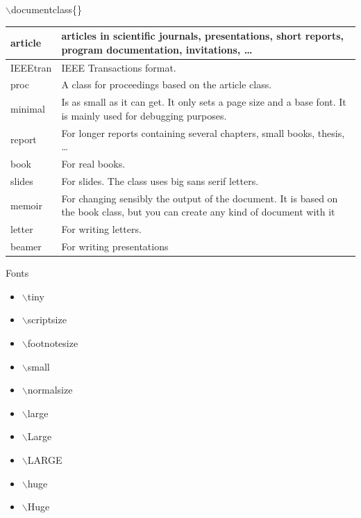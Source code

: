 \documentclass[10pt,times]{beamer}
\begin{document}
\begin{frame}{$\backslash$documentclass\{\}}

\begin{table}
\begin{tabular}{|l|p{}|}
\hline
article & articles in scientific journals, presentations, short reports, program documentation, invitations, \dots \\ \hline
IEEEtran & IEEE Transactions format.\\ \hline
proc & A class for proceedings based on the article class.\\ \hline
minimal & Is as small as it can get. It only sets a page size and a base font. It is mainly used for debugging purposes.\\ \hline
report & For longer reports containing several chapters, small books, thesis, \dots \\ \hline
book & For real books.\\ \hline
slides & For slides. The class uses big sans serif letters.\\ \hline
memoir & For changing sensibly the output of the document. It is based on the book class, but you can create any kind of document with it\\ \hline
letter & For writing letters. \\ \hline
beamer& For writing presentations \\ \hline
\end{tabular}
\end{table}
\end{frame}


\begin{frame}{Fonts}
\begin{itemize}
\item \tiny $\backslash$tiny
\item \scriptsize $\backslash$scriptsize
\item \footnotesize $\backslash$footnotesize
\item \small $\backslash$small
\item \normalsize $\backslash$normalsize
\item \large $\backslash$large
\item \Large $\backslash$Large
\item \LARGE $\backslash$LARGE
\item \huge $\backslash$huge
\item \Huge $\backslash$Huge
\end{itemize}
\end{frame}
\end{document}
